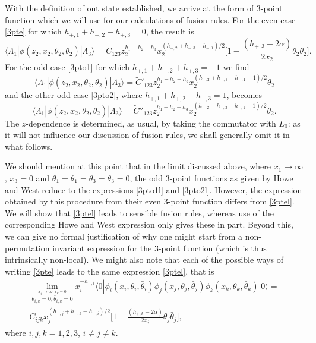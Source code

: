 \documentclass[a4paper,12pt]{article}
\def\thetabar    {\bar{\theta}}
\begin{document}
With the definition of out state established, we arrive at the form of
3-point function which we will use for our calculations of fusion
rules.  For the even case \eqref{3pte} for which
$h_{+,1}+h_{+,2}+h_{+,3}=0$, the result is 
\begin{equation}
\label{3ptel}
\langle \Lambda_1 | \phi (z_2,x_2,\theta_2,\thetabar_2) | \Lambda_3
\rangle = C_{123} z_2^{h_1-h_2-h_3} x_2^{(h_{-,2}+h_{-,3}-h_{-,1})/2}
\bigg[1-\frac{(h_{+,3}-2\alpha)}{2x_2}\theta_2\thetabar_2\bigg]. 
\end{equation}
For the odd case \eqref{3pto1} for which $h_{+,1}+h_{+,2}+h_{+,3}=-1$ we find
\begin{equation}
\label{3pto1l}
\langle \Lambda_1 | \phi (z_2,x_2,\theta_2,\thetabar_2) | \Lambda_3
\rangle = \tilde{C}'_{123} z_2^{h_1-h_2-h_3}
x_2^{(h_{-,2}+h_{-,3}-h_{-,1}-1)/2}\theta_2
\end{equation}
and the other odd case \eqref{3pto2}, where
$h_{+,1}+h_{+,2}+h_{+,3}=1$, becomes
\begin{equation}
\label{3pto2l} 
\langle \Lambda_1 | \phi (z_2,x_2,\theta_2,\thetabar_2) | \Lambda_3
\rangle = \tilde{C}''_{123} z_2^{h_1-h_2-h_3}
x_2^{(h_{-,2}+h_{-,3}-h_{-,1}-1)/2}\thetabar_2.
\end{equation}
The $z$-dependence is determined, as usual, by taking the commutator
with $L_0$: as it will not influence our discussion of fusion rules,
we shall generally omit it in what follows.

We should mention at this point that in the limit discussed above,
where $x_1\rightarrow \infty$, $x_3=0$ and
$\theta_1=\thetabar_1=\theta_3=\thetabar_3=0$, the odd 3-point
functions as given by Howe and West \cite{West} reduce to the
expressions \eqref{3pto1l} and \eqref{3pto2l}.  However, the
expression obtained by this procedure from their even 3-point
function differs from \eqref{3ptel}.  We will show that \eqref{3ptel}
leads to sensible fusion rules, whereas use of the corresponding Howe
and West expression only gives these in part.  Beyond this,
we can give no formal justification of why one might start from a
non-permutation invariant expression for the 3-point function
(which is thus intrinsically non-local).  We might also note that each
of the possible ways of writing \eqref{3pte} leads to the same
expression \eqref{3ptel}, that is
\begin{multline}
\lim_{\stackrel{\scriptstyle x_i \rightarrow
\infty,x_k=0}{\theta_{i,k}=0,\thetabar_{i,k}=0}} x_i^{-h_{-,i}}\langle 0 | \phi_i(x_i,\theta_i,\thetabar_i)
\phi_j(x_j,\theta_j,\thetabar_j) \phi_k(x_k,\theta_k,\thetabar_k) |
0 \rangle = \\
 C_{ijk}x_j^{(h_{-,j}+h_{-,k}-h_{-,i})/2}
\bigg[1-\frac{(h_{+,k}-2\alpha)}{2x_j}\theta_j\thetabar_j\bigg], 
\end{multline}
where $i,j,k=1,2,3$, $i\neq j\neq k$.
\end{document}
